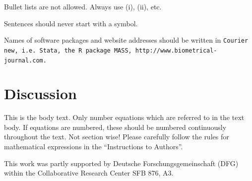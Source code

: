 \documentclass[bimj,fleqn]{w-art}
\theoremstyle{plain}
\theoremstyle{definition}
\begin{document}
\noindent Bullet lists are not allowed. Always use (i), (ii), etc.
\vspace*{12pt}

\noindent Sentences should never start with a symbol.
\vspace*{12pt}

\noindent Names of software packages and website addresses should be written in {\tt{Courier new, i.e. Stata, the R package
MASS, http://www.biometrical-journal.com.}}

\section{Discussion}





\noindent This is the body text. Only number equations which are referred to in the text body. If equations
are numbered, these should be numbered continuously throughout the text. Not section wise! Please
carefully follow the rules for mathematical expressions in the ``Instructions to Authors''.

\begin{acknowledgement}
This work was partly supported by Deutsche Forschungsgemeinschaft (DFG) within the Collaborative Research Center SFB 876, A3.
\end{acknowledgement}
\vspace*{1pc}
\end{document}
